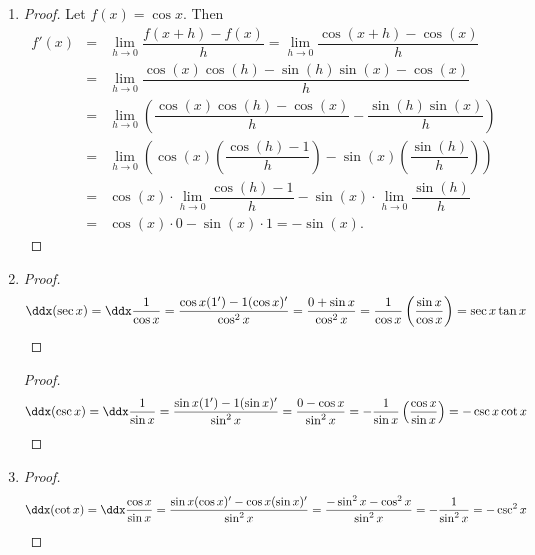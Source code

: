 \documentclass{book}
\newcommand{\ddydxdx}{\dfrac{d^2y}{dx^2}}
\begin{document}
\begin{appendices}
\begin{enumerate}[!HW!]
\item 
\begin{proof}
Let $f(x) = \cos x$. Then 
\begin{eqnarray*}
f'(x) &=& \lim_{h\to 0} \dfrac{f(x+h) - f(x)}{h} = \lim_{h\to 0} \dfrac{\cos(x+h) - \cos(x)}{h}\\
&=& \lim_{h\to 0} \dfrac{\cos(x)\cos(h) - \sin(h)\sin(x) - \cos(x)}{h}\\
&=& \lim_{h\to 0} \left(\dfrac{\cos(x)\cos(h) - \cos(x)}{h} - \dfrac{\sin(h)\sin(x)}{h}\right)\\
&=& \lim_{h\to 0} \left(\cos(x)\left(\dfrac{\cos(h) - 1}{h}\right) - \sin(x)\left(\dfrac{\sin(h)}{h}\right)\right)\\
&=& \cos(x)\cdot \lim_{h\to 0} \dfrac{\cos(h) - 1}{h} - \sin(x)\cdot \lim_{h\to 0}\dfrac{\sin(h)}{h}\\
&=& \cos(x) \cdot 0 - \sin(x) \cdot 1  = -\sin(x).
\end{eqnarray*} 
\end{proof}
\item \begin{proof}
\begin{multline*} \ddx(\sec x) = \ddx\dfrac{1}{\cos x} = \dfrac{\cos x(1') - 1(\cos x)'}{\cos^2x} = \dfrac{0+\sin x}{\cos^2x} = \dfrac{1}{\cos x}\left(\dfrac{\sin x}{\cos x}\right) = \sec x\tan x \qedhere\end{multline*}
\end{proof}  
\itemspade 
\begin{proof}
\begin{multline*} \ddx(\csc x) = \ddx\dfrac{1}{\sin x} = \dfrac{\sin x(1') - 1(\sin x)'}{\sin^2x} = \dfrac{0-\cos x}{\sin^2x}= -\dfrac{1}{\sin x}\left(\dfrac{\cos x}{\sin x}\right) = -\csc x\cot x \qedhere\end{multline*}
\end{proof}
\item \begin{proof}
\begin{multline*}
\ddx(\cot x) = \ddx\dfrac{\cos x}{\sin x} = \dfrac{\sin x(\cos x)' - \cos x(\sin x)'}{\sin^2x} = \dfrac{-\sin^2 x-\cos^2 x}{\sin^2x} = -\dfrac{1}{\sin^2 x} = -\csc^2 x \qedhere\end{multline*}
\end{proof}  
\end{enumerate}
\vspace{-15pt}



\end{appendices}
\end{document}
